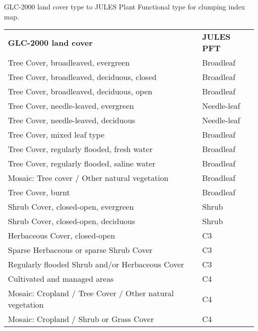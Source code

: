 \documentclass[a4paper,11pt]{report}
\begin{document}
\begin{threeparttable}[ht!]
\centering
\caption{GLC-2000 land cover type to JULES Plant Functional type for clumping index map.}
\begin{tabular}{l{} l{}}
     \hline
     \hline
\textbf{GLC-2000 land cover}   & \textbf{JULES PFT}\\
\noalign{\smallskip}\hline
Tree Cover, broadleaved, evergreen                       & Broadleaf\\ 
Tree Cover, broadleaved, deciduous, closed               & Broadleaf\\
Tree Cover, broadleaved, deciduous, open                 & Broadleaf\\
Tree Cover, needle-leaved, evergreen                     & Needle-leaf\\
Tree Cover, needle-leaved, deciduous                     & Needle-leaf\\
Tree Cover, mixed leaf type                              & Broadleaf\\
Tree Cover, regularly flooded, fresh  water              & Broadleaf\\
Tree Cover, regularly flooded, saline water              & Broadleaf\\
Mosaic: Tree cover / Other natural vegetation            & Broadleaf\\
Tree Cover, burnt                                        & Broadleaf\\
Shrub Cover, closed-open, evergreen                      & Shrub\\
Shrub Cover, closed-open, deciduous                      & Shrub\\
Herbaceous Cover, closed-open                            & C3\\
Sparse Herbaceous or sparse Shrub Cover                  & C3\\
Regularly flooded Shrub and/or Herbaceous Cover          & C3\\
Cultivated and managed areas                             & C4\\
Mosaic: Cropland / Tree Cover / Other natural vegetation & C4\\
Mosaic: Cropland / Shrub or Grass Cover                  & C4\\

\end{tabular}
\end{threeparttable}
\end{document}
